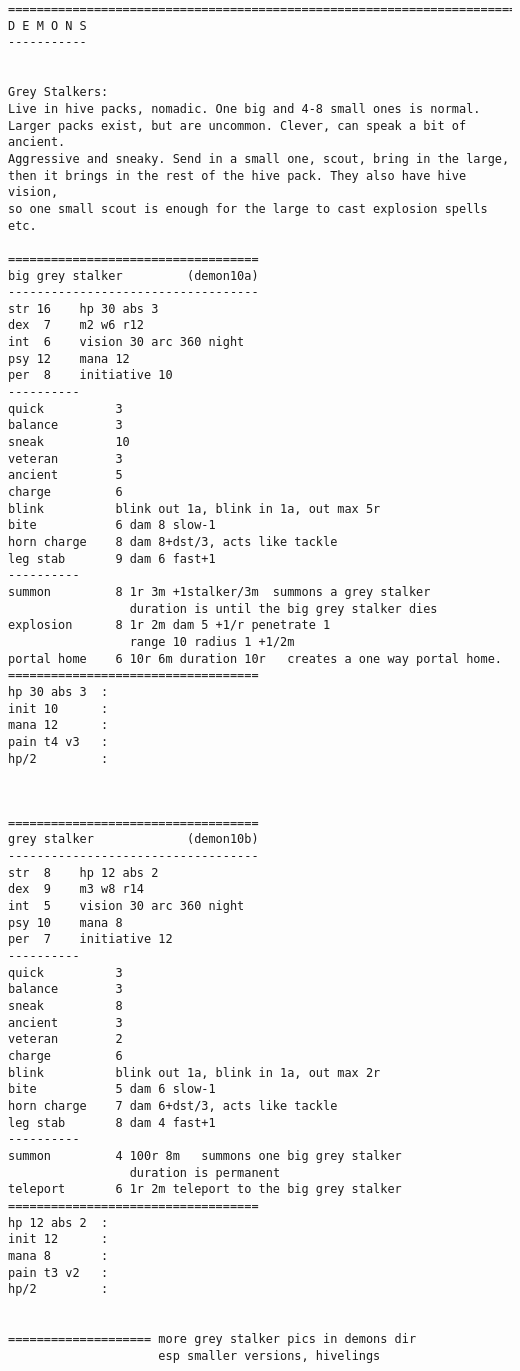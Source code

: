 \goodbreak \begin{samepage} \small \begin{verbatim}
================================================================================
D E M O N S
-----------


Grey Stalkers:
Live in hive packs, nomadic. One big and 4-8 small ones is normal.
Larger packs exist, but are uncommon. Clever, can speak a bit of ancient.
Aggressive and sneaky. Send in a small one, scout, bring in the large,
then it brings in the rest of the hive pack. They also have hive vision,
so one small scout is enough for the large to cast explosion spells etc.

===================================
big grey stalker         (demon10a)
-----------------------------------
str 16    hp 30 abs 3
dex  7    m2 w6 r12
int  6    vision 30 arc 360 night
psy 12    mana 12
per  8    initiative 10
----------
quick          3
balance        3
sneak          10
veteran        3
ancient        5
charge         6
blink          blink out 1a, blink in 1a, out max 5r
bite           6 dam 8 slow-1
horn charge    8 dam 8+dst/3, acts like tackle
leg stab       9 dam 6 fast+1
----------
summon         8 1r 3m +1stalker/3m  summons a grey stalker
                 duration is until the big grey stalker dies
explosion      8 1r 2m dam 5 +1/r penetrate 1
                 range 10 radius 1 +1/2m
portal home    6 10r 6m duration 10r   creates a one way portal home.
===================================
hp 30 abs 3  :
init 10      :
mana 12      :
pain t4 v3   :
hp/2         :

\end{verbatim} \normalsize \end{samepage}

\

\goodbreak \begin{samepage} \small \begin{verbatim}
===================================
grey stalker             (demon10b)
-----------------------------------
str  8    hp 12 abs 2
dex  9    m3 w8 r14
int  5    vision 30 arc 360 night
psy 10    mana 8
per  7    initiative 12
----------
quick          3
balance        3
sneak          8
ancient        3
veteran        2
charge         6
blink          blink out 1a, blink in 1a, out max 2r
bite           5 dam 6 slow-1
horn charge    7 dam 6+dst/3, acts like tackle
leg stab       8 dam 4 fast+1
----------
summon         4 100r 8m   summons one big grey stalker
                 duration is permanent
teleport       6 1r 2m teleport to the big grey stalker
===================================
hp 12 abs 2  :
init 12      :
mana 8       :
pain t3 v2   :
hp/2         :


==================== more grey stalker pics in demons dir
                     esp smaller versions, hivelings
\end{verbatim} \normalsize \end{samepage}

